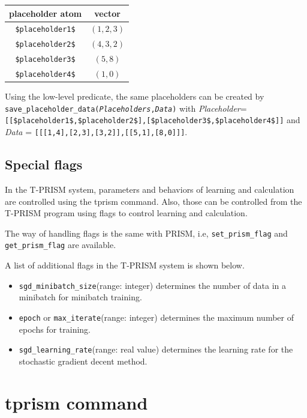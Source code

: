 \documentclass[a4paper]{report}
\begin{document}
\begin{tabular}{|c|c|}
	\hline 
	placeholder atom& vector \\ 
	\hline 
	\verb|$placeholder1$|& $(1,2,3)$ \\ 
	\hline 
	\verb|$placeholder2$|& $(4,3,2)$ \\ 
	\hline 
	\verb|$placeholder3$|& $(5,8)$ \\ 
	\hline 
	\verb|$placeholder4$|& $(1,0)$ \\ 
	\hline 
\end{tabular} 

Using the low-level predicate, the same placeholders can be created by {\tt save\_placeholder\_data({\it Placeholders},{\it Data})} with
{\it Placeholder}={\tt [[\$placeholder1\$,\$placeholder2\$],[\$placeholder3\$,\$placeholder4\$]]}
and {\it Data} = {\tt [[[1,4],[2,3],[3,2]],[[5,1],[8,0]]]}.

\subsection{Special flags}
In the T-PRISM system, parameters and behaviors of learning and calculation are controlled using the tprism command.
Also, those can be controlled from the T-PRISM program using flags to control learning and calculation.

The way of handling flags is the same with PRISM, i.e, {\tt set\_prism\_flag} and {\tt get\_prism\_flag} are available.


A list of additional flags in the T-PRISM system is shown below.
\begin{itemize}
\item \verb|sgd_minibatch_size|(range: integer) determines the number of data in a minibatch for minibatch training.
\item \verb|epoch| or \verb|max_iterate|(range: integer) determines the maximum number of epochs for training.
\item \verb|sgd_learning_rate|(range: real value) determines the learning rate for the stochastic gradient decent method.
\end{itemize}





\section{tprism command}
\label{sec:tprism_command}
\end{document}
